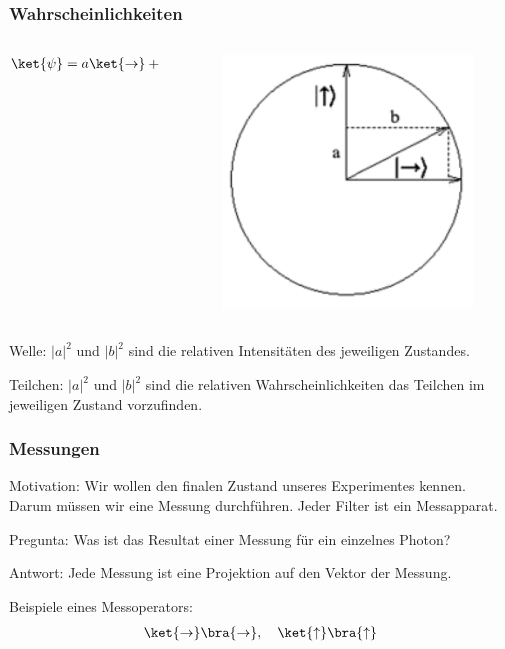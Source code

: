 \documentclass{beamer}
\begin{document}
\begin{frame}
\frametitle{Wahrscheinlichkeiten}
\begin{columns}
    \begin{column}{5cm}
        \begin{align*}
            \ket{\psi} &= a\ket{\to} + b\ket{\uparrow}
        \end{align*}
    \end{column}
    \begin{column}{5cm}
        \begin{figure}
            \centering
            \includegraphics[height=0.3\textheight]{fig24.png}
            \label{fig24}
        \end{figure}
    \end{column}
\end{columns}

\bigskip
Welle: $|a|^2$ und $|b|^2$ sind die relativen Intensit\"aten des jeweiligen Zustandes.

\bigskip
Teilchen: $|a|^2$ und $|b|^2$ sind die relativen Wahrscheinlichkeiten das Teilchen im jeweiligen Zustand vorzufinden.
\end{frame}

\begin{frame}
\frametitle{Messungen}
Motivation: Wir wollen den finalen Zustand unseres Experimentes kennen.  Darum m\"ussen wir eine Messung durchf\"uhren.  Jeder Filter ist ein Messapparat.

\bigskip
Pregunta: Was ist das Resultat einer Messung f\"ur ein einzelnes Photon?

\bigskip
Antwort: Jede Messung ist eine Projektion auf den Vektor der Messung.

\bigskip
Beispiele eines Messoperators:
\begin{align*}
    \ket{\rightarrow}\bra{\rightarrow},
    \quad
    \ket{\uparrow}\bra{\uparrow}
\end{align*}
\end{frame}
\end{document}
